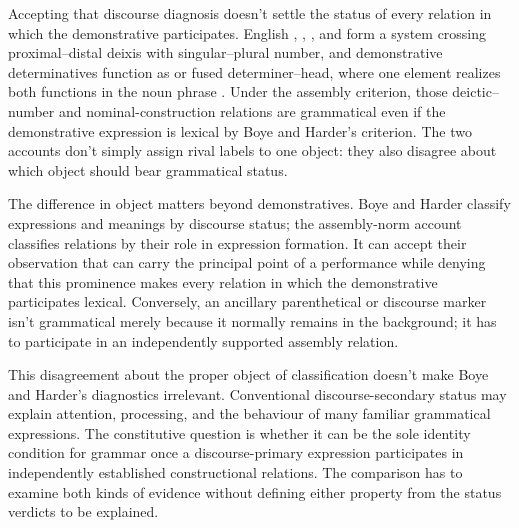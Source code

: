 \documentclass[12pt,letterpaper]{article}
\begin{document}
Accepting that discourse diagnosis doesn't settle the status of every relation in
which the demonstrative participates. English , ,
, and  form a system crossing proximal--distal deixis
with singular--plural number, and demonstrative determinatives function as
 or fused determiner--head, where one element realizes both
functions in the noun phrase \citep[373--374, 410--415]{huddleston2002}. Under the
assembly criterion, those
deictic--number and nominal-construction relations are grammatical even if the
demonstrative expression is lexical by Boye and Harder's criterion. The two
accounts don't simply assign rival labels to one object: they also disagree about
which object should bear grammatical status.

The difference in object matters beyond demonstratives. Boye and Harder classify
expressions and meanings by discourse status; the assembly-norm account classifies
relations by their role in expression formation. It can accept their observation
that  can carry the principal point of
a performance while denying that this prominence makes every relation in which
the demonstrative participates lexical. Conversely, an ancillary parenthetical or
discourse marker isn't grammatical merely because it normally remains in the
background; it has to participate in an independently supported assembly
relation.

This disagreement about the proper object of classification doesn't make Boye and
Harder's diagnostics irrelevant. Conventional discourse-secondary status may
explain attention, processing, and the behaviour of many familiar grammatical
expressions. The constitutive question is whether it can be the sole identity
condition for grammar once a discourse-primary expression participates in
independently established constructional relations. The comparison has to examine
both kinds of evidence without defining either property from the status verdicts
to be explained.
\end{document}
